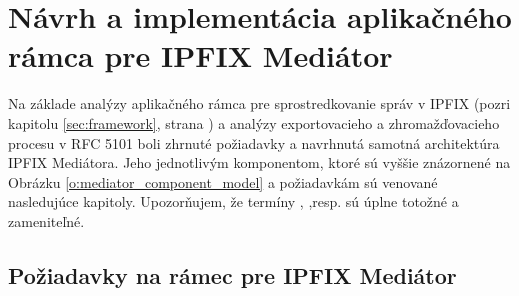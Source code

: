 \section{Návrh a implementácia aplikačného rámca pre IPFIX Mediátor}

Na základe analýzy aplikačného rámca pre sprostredkovanie správ v IPFIX (pozri kapitolu \ref{sec:framework}, 
strana \pageref{sec:framework}) a analýzy exportovacieho a zhromažďovacieho procesu v RFC 5101
\citep{rfc5101} boli zhrnuté požiadavky a navrhnutá samotná architektúra IPFIX Mediátora. 
Jeho jednotlivým komponentom, ktoré sú vyššie znázornené na Obrázku \ref{o:mediator_component_model} 
a požiadavkám sú venované nasledujúce kapitoly. Upozorňujem, že termíny , 
,resp.  sú úplne totožné a zameniteľné.


\subsection{Požiadavky na rámec pre IPFIX Mediátor}

